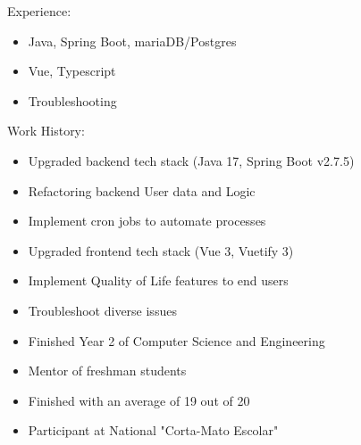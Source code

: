 \documentclass[10pt,a4paper,ragged2e,withhyper]{altacv}
\begin{document}
\begin{paracol}{2}



Experience:
\begin{itemize}
\item Java, Spring Boot, mariaDB/Postgres
\item Vue, Typescript
\item Troubleshooting
\end{itemize}

Work History:
\begin{itemize}
\item Upgraded backend tech stack (Java 17, Spring Boot v2.7.5)
\item Refactoring backend User data and Logic
\item Implement cron jobs to automate processes
\item Upgraded frontend tech stack (Vue 3, Vuetify 3)
\item Implement Quality of Life features to end users
\item Troubleshoot diverse issues
\end{itemize}



\begin{itemize}
\item Finished Year 2 of Computer Science and Engineering
\item Mentor of freshman students
\end{itemize}

\divider

\begin{itemize}

\item Finished with an average of 19 out of 20
\item Participant at National "Corta-Mato Escolar"

\end{itemize}



\end{paracol}
\end{document}
